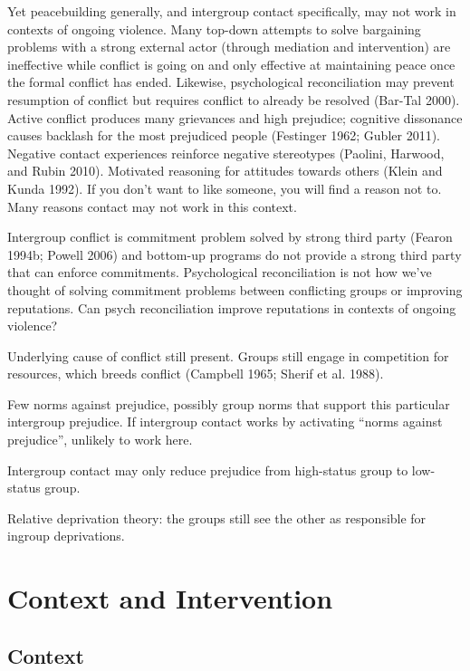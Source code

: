 \documentclass[11pt]{article}
\begin{document}
Yet peacebuilding generally, and intergroup contact specifically, may
not work in contexts of ongoing violence. Many top-down attempts to
solve bargaining problems with a strong external actor (through
mediation and intervention) are ineffective while conflict is going on
and only effective at maintaining peace once the formal conflict has
ended. Likewise, psychological reconciliation may prevent resumption of
conflict but requires conflict to already be resolved (Bar-Tal 2000).
Active conflict produces many grievances and high prejudice; cognitive
dissonance causes backlash for the most prejudiced people (Festinger
1962; Gubler 2011). Negative contact experiences reinforce negative
stereotypes (Paolini, Harwood, and Rubin 2010). Motivated reasoning for
attitudes towards others (Klein and Kunda 1992). If you don't want to
like someone, you will find a reason not to. Many reasons contact may
not work in this context.

Intergroup conflict is commitment problem solved by strong third party
(Fearon 1994b; Powell 2006) and bottom-up programs do not provide a
strong third party that can enforce commitments. Psychological
reconciliation is not how we've thought of solving commitment problems
between conflicting groups or improving reputations. Can psych
reconciliation improve reputations in contexts of ongoing violence?

Underlying cause of conflict still present. Groups still engage in
competition for resources, which breeds conflict (Campbell 1965; Sherif
et al. 1988).

Few norms against prejudice, possibly group norms that support this
particular intergroup prejudice. If intergroup contact works by
activating ``norms against prejudice'', unlikely to work here.

Intergroup contact may only reduce prejudice from high-status group to
low-status group.

Relative deprivation theory: the groups still see the other as
responsible for ingroup deprivations.

\section{Context and Intervention}\label{context-and-intervention}

\subsection{Context}\label{context}
\end{document}
